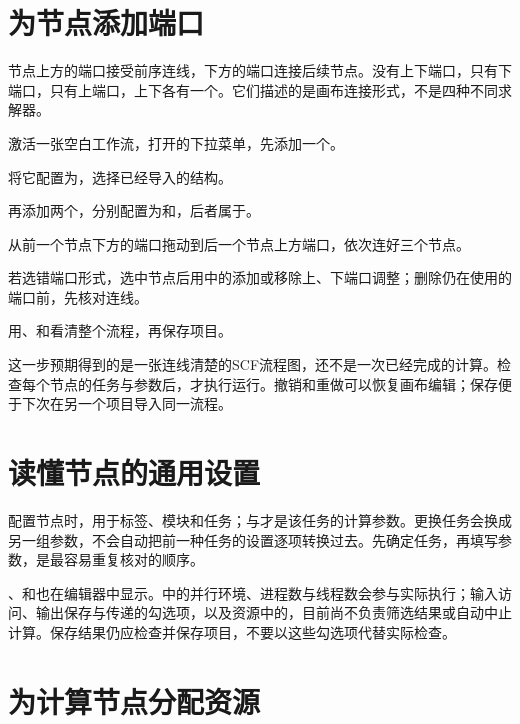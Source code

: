 \section{为节点添加端口}

节点上方的端口接受前序连线，下方的端口连接后续节点。没有上下端口，只有下端口，只有上端口，上下各有一个。它们描述的是画布连接形式，不是四种不同求解器。

\begin{steps}
\item 激活一张空白工作流，打开的下拉菜单，先添加一个。
\item 将它配置为，选择已经导入的结构。
\item 再添加两个，分别配置为和，后者属于。
\item 从前一个节点下方的端口拖动到后一个节点上方端口，依次连好三个节点。
\item 若选错端口形式，选中节点后用中的添加或移除上、下端口调整；删除仍在使用的端口前，先核对连线。
\item 用、和看清整个流程，再保存项目。
\end{steps}

这一步预期得到的是一张连线清楚的SCF流程图，还不是一次已经完成的计算。检查每个节点的任务与参数后，才执行运行。撤销和重做可以恢复画布编辑；保存便于下次在另一个项目导入同一流程。

\section{读懂节点的通用设置}

配置节点时，用于标签、模块和任务；与才是该任务的计算参数。更换任务会换成另一组参数，不会自动把前一种任务的设置逐项转换过去。先确定任务，再填写参数，是最容易重复核对的顺序。

、和也在编辑器中显示。中的并行环境、进程数与线程数会参与实际执行；输入访问、输出保存与传递的勾选项，以及资源中的，目前尚不负责筛选结果或自动中止计算。保存结果仍应检查并保存项目，不要以这些勾选项代替实际检查。

\section{为计算节点分配资源}\label{sec:node-resources}

